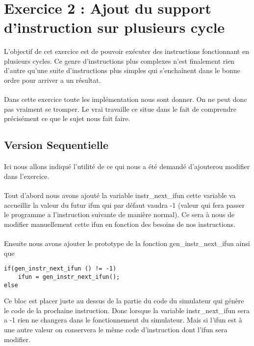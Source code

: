\documentclass[12pt]{article}
\begin{document}
\newpage

\section{Exercice 2 : Ajout du support d'instruction sur plusieurs cycle}

\paragraph{}L'objectif de cet exercice est de pouvoir exécuter des instructions fonctionnant en plusieurs cycles. Ce genre d'instructions plus complexes n'est finalement rien d'autre qu'une suite d'instructions plus simples qui s’enchaînent dans le bonne ordre pour arriver a un résultat.

\paragraph{} Dans cette exercice toute les implémentation nous sont donner. On ne peut donc pas vraiment se tromper. Le vrai travaille ce situe dans le fait de comprendre précisément ce que le sujet nous fait faire.

\subsection{Version Sequentielle}
\paragraph{}Ici nous allons indiqué l'utilité de ce qui nous a été demandé d'ajouterou modifier dans l'exercice.

\paragraph{}Tout d'abord nous avons  ajouté la variable instr\_next\_ifun cette variable va accueillir la valeur du futur ifun qui par défaut vaudra -1 (valeur qui fera passer le programme a l'instruction suivante de manière normal). Ce sera à nous de modifier manuellement cette ifun en fonction des besoins de nos instructions.

\paragraph{}Ensuite nous avons ajouter le prototype de la fonction gen\_instr\_next\_ifun ainsi que 
\begin{verbatim}
if(gen_instr_next_ifun () != -1)
	ifun = gen_instr_next_ifun();
else
\end{verbatim}
Ce bloc est placer juste au dessus de la partie du code du simulateur qui génère le code de la prochaine instruction. Donc lorsque la variable instr\_next\_ifun sera a -1 rien ne changera dans le fonctionnement du simulateur. Mais si l'ifun est à une autre valeur on conservera le même code d'instruction dont l'ifun sera modifier.
\end{document}
